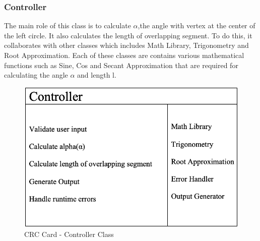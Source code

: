     \subsubsection{Controller}
      \parbox{1.0\linewidth}{
        The main role of this class is to calculate $\alpha$,the angle with vertex at the center of the left circle. It also calculates the length of overlapping segment. To do this, it collaborates with other classes which includes Math Library, Trigonometry and Root Approximation. Each of these classes are contains various mathematical functions such as Sine, Cos and Secant Approximation that are required for calculating the angle $\alpha$ and length l.
      }
      \vspace*{2em}
      \begin{figure}[h!]
        \centering
        \includegraphics[width=.5\linewidth]{resources/Controller.png}
        \caption{CRC Card - Controller Class}\label{fig:control}
      \end{figure}

